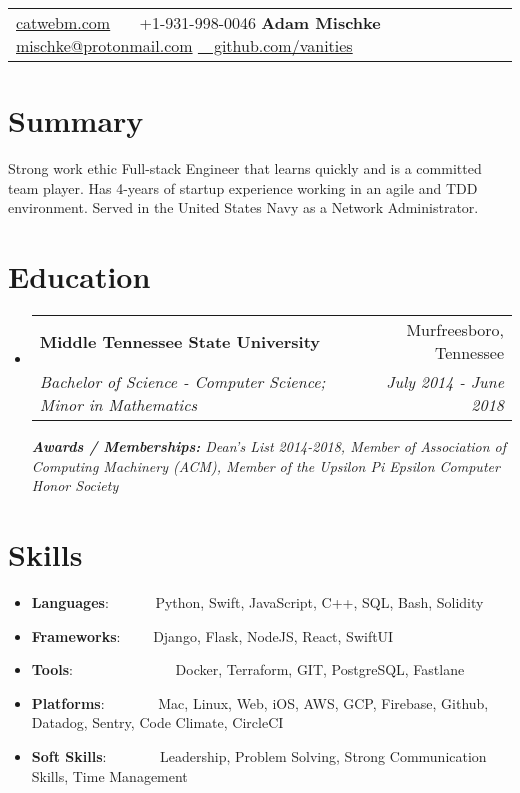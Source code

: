 \documentclass[a4paper,20pt]{article}
\makeatletter
\newcommand{\resumeItem}[2]{
  \item\small{
    \textbf{#1}{: #2 \vspace{-2pt}}
  }
}
\newcommand{\resumeSubheading}[4]{
  \vspace{-1pt}\item
    \begin{tabular*}{0.97\textwidth}{l@{\extracolsep{\fill}}r}
      \textbf{#1} & #2 \\
      \textit{#3} & \textit{#4} \\
    \end{tabular*}\vspace{-5pt}
}
\newcommand{\resumeSubItem}[2]{\resumeItem{#1}{#2}\vspace{-3pt}}
\newcommand{\resumeSubHeadingListStart}{\begin{itemize}[leftmargin=*]}
\newcommand{\resumeSubHeadingListEnd}{\end{itemize}}
\makeatother
\begin{document}
\begin{tabularx}{\textwidth}{X|X|X|X}
  \href{https://catwebm.com}{catwebm.com}
  ~~~+1-931-998-0046
  \textbf{{\LARGE Adam Mischke}}
  \href{mailto:}{mischke@protonmail.com}
  \href{https://github.com/vanities}{~~github.com/vanities}
\end{tabularx}

{\color{BrickRed} \section{Summary}}
  Strong work ethic Full-stack Engineer that learns quickly and is a committed team player. Has 4-years of startup experience working in an agile and TDD environment. Served in the United States Navy as a Network Administrator.
 \vspace{12pt}

{\color{YellowOrange} \section{Education}}
  \resumeSubHeadingListStart
    \resumeSubheading
      {Middle Tennessee State University}{Murfreesboro, Tennessee}
      {Bachelor of Science - Computer Science; Minor in Mathematics}{July 2014 - June 2018}
      {\scriptsize \textit{ \footnotesize{\newline{}\textbf{Awards / Memberships:} Dean’s List 2014-2018, Member of Association of Computing Machinery (ACM), Member of the Upsilon Pi Epsilon Computer Honor Society}}}
    \resumeSubHeadingListEnd
\vspace{-5pt}

{\color{Mulberry} \section{Skills}}
	\resumeSubHeadingListStart
	\resumeSubItem{Languages}{~~~~~~Python, Swift, JavaScript, C++, SQL, Bash, Solidity }
	\resumeSubItem{Frameworks}{~~~~Django, Flask, NodeJS, React, SwiftUI }
	\resumeSubItem{Tools}{~~~~~~~~~~~~~~Docker, Terraform, GIT, PostgreSQL, Fastlane}
	\resumeSubItem{Platforms}{~~~~~~~Mac, Linux, Web, iOS, AWS, GCP, Firebase, Github, Datadog, Sentry, Code Climate, CircleCI}
	\resumeSubItem{Soft Skills}{~~~~~~~Leadership, Problem Solving, Strong Communication Skills, Time Management}
\resumeSubHeadingListEnd
\vspace{-5pt}
\end{document}
